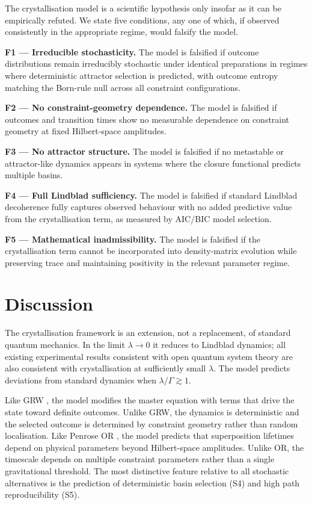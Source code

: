 \documentclass[12pt]{article}
\begin{document}
The crystallisation model is a scientific hypothesis only insofar as it can be empirically refuted. We state five conditions, any one of which, if observed consistently in the appropriate regime, would falsify the model.

\textbf{F1 --- Irreducible stochasticity.} The model is falsified if outcome distributions remain irreducibly stochastic under identical preparations in regimes where deterministic attractor selection is predicted, with outcome entropy matching the Born-rule null across all constraint configurations.

\textbf{F2 --- No constraint-geometry dependence.} The model is falsified if outcomes and transition times show no measurable dependence on constraint geometry at fixed Hilbert-space amplitudes.

\textbf{F3 --- No attractor structure.} The model is falsified if no metastable or attractor-like dynamics appears in systems where the closure functional predicts multiple basins.

\textbf{F4 --- Full Lindblad sufficiency.} The model is falsified if standard Lindblad decoherence fully captures observed behaviour with no added predictive value from the crystallisation term, as measured by AIC/BIC model selection.

\textbf{F5 --- Mathematical inadmissibility.} The model is falsified if the crystallisation term cannot be incorporated into density-matrix evolution while preserving trace and maintaining positivity in the relevant parameter regime.

\section{Discussion}

The crystallisation framework is an extension, not a replacement, of standard quantum mechanics. In the limit $\lambda \to 0$ it reduces to Lindblad dynamics; all existing experimental results consistent with open quantum system theory are also consistent with crystallisation at sufficiently small $\lambda$. The model predicts deviations from standard dynamics when $\lambda/\Gamma \gtrsim 1$.

Like GRW \citep{GRW1986}, the model modifies the master equation with terms that drive the state toward definite outcomes. Unlike GRW, the dynamics is deterministic and the selected outcome is determined by constraint geometry rather than random localisation. Like Penrose OR \citep{Penrose1996}, the model predicts that superposition lifetimes depend on physical parameters beyond Hilbert-space amplitudes. Unlike OR, the timescale depends on multiple constraint parameters rather than a single gravitational threshold. The most distinctive feature relative to all stochastic alternatives is the prediction of deterministic basin selection (S4) and high path reproducibility (S5).
\end{document}
